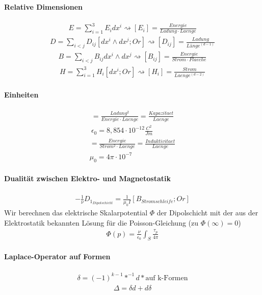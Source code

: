 \documentclass[10pt,a4paper]{article}
\begin{document}
\paragraph{Relative Dimensionen}
\begin{align}
E= \sum_{i=1}^3 E_i dx^i \rightsquigarrow [E_i]=\frac{Energie}{Ladung \cdot Laenge}
\end{align}
\begin{align}
D=\sum_{i<j} D_{ij} [dx^i \wedge dx^j ; Or] \rightsquigarrow [D_{ij}]=\frac{Ladung}{Länge^{(d-1)}}
\end{align}
\begin{align}
B= \sum_{i<j} B_{ij} dx^i \wedge dx^j \rightsquigarrow [B_{ij}]=\frac{Energie}{Strom \cdot Flaeche}
\end{align}
\begin{align}
H= \sum_{i=1}^3 H_i [dx^i ; Or] \rightsquigarrow [H_i]= \frac{Strom}{Laenge^{(d-2)}}
\end{align}
\paragraph{Einheiten} $\,$ \\
\begin{align}
[\epsilon_0] = \frac{Ladung^2}{Energie \cdot Laenge} = \frac{Kapazitaet}{Laenge} \\
\epsilon_0 = 8,854 \cdot 10^{-12} \frac{C^2}{Jm}
\end{align}
\begin{align}
[\mu_0]= \frac{Energie}{Strom^2 \cdot Laenge} =\frac{Induktivitaet}{Laenge} \\
\mu_0 = 4 \pi \cdot 10^{-7}
\end{align}
\paragraph{Dualität zwischen Elektro- und Magnetostatik} $\,$ \\
\begin{align}
-\frac{1}{\nu} D_{1_{Dipolschicht}} = \frac{1}{\mu_0 I} [B_{Stromschleife} ; Or]
\end{align}
Wir berechnen das elektrische Skalarpotential $ \Phi $ der Dipolschicht mit der aus der Elektrostatik bekannten Lösung für die Poisson-Gleichung (zu $ \Phi (\infty) =0 $)
\begin{align}
\Phi (p)= \frac{\nu}{\epsilon_0} \int_S \frac{\tau_p}{4 \pi}
\end{align}
\paragraph{Laplace-Operator auf Formen} $\, $ \\
\begin{align}
\delta = (-1)^{k-1} *^{-1} d * \text{auf k-Formen}
\end{align}
\begin{align}
\Delta = \delta d + d \delta
\end{align}
\end{document}
